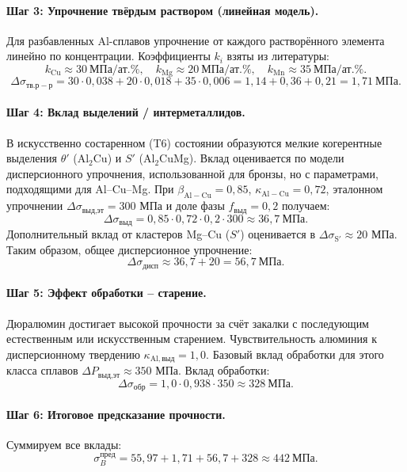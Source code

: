 \documentclass[12pt,a4paper]{article}
\begin{document}
	\paragraph{Шаг 3: Упрочнение твёрдым раствором (линейная модель).}
	Для разбавленных Al-сплавов упрочнение от каждого растворённого элемента линейно по концентрации. Коэффициенты \(k_i\) взяты из литературы:
	\[
	k_{\mathrm{Cu}} \approx 30\ \text{МПа/ат.\%},\quad
	k_{\mathrm{Mg}} \approx 20\ \text{МПа/ат.\%},\quad
	k_{\mathrm{Mn}} \approx 35\ \text{МПа/ат.\%}.
	\]
	\[
	\Delta\sigma_{\mathrm{тв.р-р}} = 30\cdot0,038 + 20\cdot0,018 + 35\cdot0,006
	= 1,14 + 0,36 + 0,21 = 1,71\ \text{МПа}.
	\]
	
	\paragraph{Шаг 4: Вклад выделений / интерметаллидов.}
	В искусственно состаренном (T6) состоянии образуются мелкие когерентные выделения \(\theta'\) (Al\(_2\)Cu) и \(S'\) (Al\(_2\)CuMg). Вклад оценивается по модели дисперсионного упрочнения, использованной для бронзы, но с параметрами, подходящими для Al–Cu–Mg. При \(\beta_{\mathrm{Al-Cu}}=0,85\), \(\kappa_{\mathrm{Al-Cu}}=0,72\), эталонном упрочнении \(\Delta\sigma_{\text{выд,эт}}=300\) МПа и доле фазы \(f_{\text{выд}}=0,2\) получаем:
	\[
	\Delta\sigma_{\text{выд}} = 0,85\cdot0,72\cdot0,2\cdot300 \approx 36,7\ \text{МПа}.
	\]
	Дополнительный вклад от кластеров Mg–Cu (\(S'\)) оценивается в \(\Delta\sigma_{\mathrm{S'}} \approx 20\) МПа. Таким образом, общее дисперсионное упрочнение:
	\[
	\Delta\sigma_{\mathrm{дисп}} \approx 36,7 + 20 = 56,7\ \text{МПа}.
	\]
	
	\paragraph{Шаг 5: Эффект обработки – старение.}
	Дюралюмин достигает высокой прочности за счёт закалки с последующим естественным или искусственным старением. Чувствительность алюминия к дисперсионному твердению \(\kappa_{\mathrm{Al,выд}}=1,0\). Базовый вклад обработки для этого класса сплавов \(\Delta P_{\text{выд,эт}}\approx 350\) МПа. Вклад обработки:
	\[
	\Delta\sigma_{\mathrm{обр}} = 1,0\cdot0,938\cdot350 \approx 328\ \text{МПа}.
	\]
	
	\paragraph{Шаг 6: Итоговое предсказание прочности.}
	Суммируем все вклады:
	\[
	\sigma_B^{\mathrm{пред}} = 55,97 + 1,71 + 56,7 + 328 \approx 442\ \text{МПа}.
	\]
	
\end{document}
